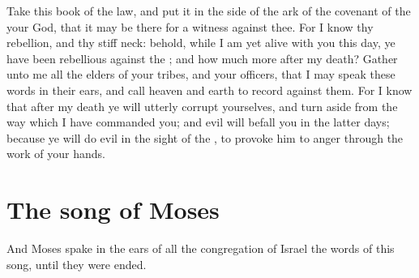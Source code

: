 \begin{biblechapter}
\verse Take this book of the law, and put it in the side of the ark of the covenant of the \LORD your God, that it may be there for a witness against thee.
\verse For I know thy rebellion, and thy stiff neck: behold, while I am yet alive with you this day, ye have been rebellious against the \LORD; and how much more after my death?
\verse Gather unto me all the elders of your tribes, and your officers, that I may speak these words in their ears, and call heaven and earth to record against them.
\verse For I know that after my death ye will utterly corrupt yourselves, and turn aside from the way which I have commanded you; and evil will befall you in the latter days; because ye will do evil in the sight of the \LORD, to provoke him to anger through the work of your hands.
\section*{The song of Moses}
\verse And Moses spake in the ears of all the congregation of Israel the words of this song, until they were ended.
\end{biblechapter}

